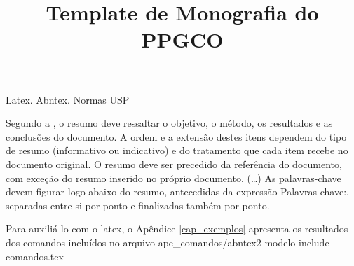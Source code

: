\documentclass[dissertmst]{ppgco}
\title{Template de Monografia do PPGCO}
\begin{document}
\renewcommand{\orientadorname}{Orientador:}
\renewcommand{\coorientadorname}{Coorientador:}
\renewcommand{\agradecimentosname}{Agradecimentos}

\pretextual

\maketitle






\begin{resumo}{Latex. Abntex. Normas USP}

 	 Segundo a , o resumo deve ressaltar o  objetivo, o método, os resultados e as conclusões do documento. A ordem e a extensão  destes itens dependem do tipo de resumo (informativo ou indicativo) e do  tratamento que cada item recebe no documento original. O resumo deve ser  precedido da referência do documento, com exceção do resumo inserido no  próprio documento. (\ldots) As palavras-chave devem figurar logo abaixo do  resumo, antecedidas da expressão Palavras-chave:, separadas entre si por  ponto e finalizadas também por ponto.
     
    Para auxiliá-lo com o latex, o Apêndice 
  \ref{cap_exemplos} apresenta os resultados dos comandos incluídos no arquivo ape\_comandos/abntex2-modelo-include-comandos.tex 

\end{resumo}
\end{document}
